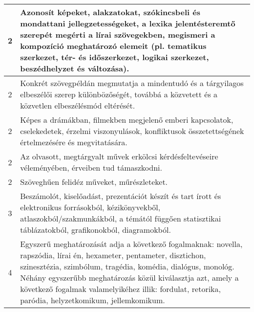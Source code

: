 \begin{longtable}{c | p{12cm} }
                                          2 &  Azonosít képeket, alakzatokat, szókincsbeli és mondattani jellegzetességeket, a lexika jelentésteremtő szerepét megérti a lírai szövegekben, megismeri a kompozíció meghatározó elemeit (pl. tematikus szerkezet, tér- és időszerkezet, logikai szerkezet, beszédhelyzet és változása). \\ \hline
                                          2 &  Konkrét szövegpéldán megmutatja a mindentudó és a tárgyilagos elbeszélői szerep különbözőségét, továbbá a közvetett és a közvetlen elbeszélésmód eltérését. \\ \hline
                                          2 &  Képes a drámákban, filmekben megjelenő emberi kapcsolatok, cselekedetek, érzelmi viszonyulások, konfliktusok összetettségének értelmezésére és megvitatására. \\ \hline
                                          2 &  Az olvasott, megtárgyalt művek erkölcsi kérdésfeltevéseire véleményében, érveiben tud támaszkodni. \\ \hline
                                          2 &  Szöveghűen felidéz műveket, műrészleteket. \\ \hline
                                      
                                
                                          3 &  Beszámolót, kiselőadást, prezentációt készít és tart írott és elektronikus forrásokból, kézikönyvekből, atlaszokból/szakmunkákból, a témától függően statisztikai táblázatokból, grafikonokból, diagramokból. \\ \hline
                                      
                                
                                          4 &  Egyszerű meghatározását adja a következő fogalmaknak: novella, rapszódia, lírai én, hexameter, pentameter, disztichon, szinesztézia, szimbólum, tragédia, komédia, dialógus, monológ. Néhány egyszerűbb meghatározás közül kiválasztja azt, amely a következő fogalmak valamelyikéhez illik: fordulat, retorika, paródia, helyzetkomikum, jellemkomikum. \\ \hline
                                      
                        \end{longtable}
            \clearpage

